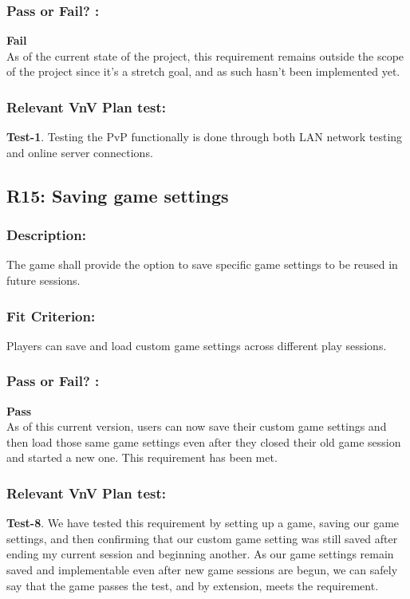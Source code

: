 \documentclass[12pt, titlepage]{article}
\begin{document}
\subsubsection*{Pass or Fail? :} 

 \noindent \textbf{Fail}\\
 
 \noindent As of the current state of the project, this requirement remains outside the scope of the project since it's a stretch goal, and as such hasn't been implemented yet. 

\subsubsection*{Relevant VnV Plan test: } \textbf{Test-1}. Testing the PvP functionally is done through both LAN network testing and online server connections.


\subsection{R15: Saving game settings} 
\label{R15} 

\subsubsection*{Description:}The game shall provide the option to save specific game settings to be reused in future sessions.

\subsubsection*{Fit Criterion:}Players can save and load custom game settings across different play sessions.


\subsubsection*{Pass or Fail? :} 

 \noindent \textbf{Pass}\\
 
 \noindent As of this current version, users can now save their custom game settings and then load those same game settings even after they closed their old game session and started a new one. This requirement has been met.

\subsubsection*{Relevant VnV Plan test: } \textbf{Test-8}. We have tested this requirement by setting up a game, saving our game settings, and then confirming that our custom game setting was still saved after ending my current session and beginning another. As our game settings remain saved and implementable even after new game sessions are begun, we can safely say that the game passes the test, and by extension, meets the requirement.
\end{document}
